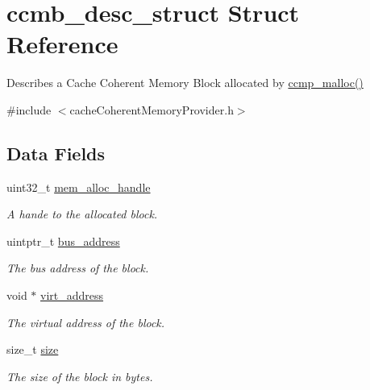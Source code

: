 \hypertarget{structccmb__desc__struct}{}\section{ccmb\+\_\+desc\+\_\+struct Struct Reference}
\label{structccmb__desc__struct}


Describes a Cache Coherent Memory Block allocated by \hyperlink{cacheCoherentMemoryProvider_8cpp_a72b3227fd1265a06a6b65e36b4c370ee}{ccmp\+\_\+malloc()}  




{\ttfamily \#include $<$cache\+Coherent\+Memory\+Provider.\+h$>$}

\subsection*{Data Fields}
\begin{DoxyCompactItemize}
\item 
uint32\+\_\+t \hyperlink{structccmb__desc__struct_a00cc7eaf94938d140481affeef8e0909}{mem\+\_\+alloc\+\_\+handle}\hypertarget{structccmb__desc__struct_a00cc7eaf94938d140481affeef8e0909}{}\label{structccmb__desc__struct_a00cc7eaf94938d140481affeef8e0909}

\begin{DoxyCompactList}\small\item\em A hande to the allocated block. \end{DoxyCompactList}\item 
uintptr\+\_\+t \hyperlink{structccmb__desc__struct_a30b6007ecbb4528361a724f8aed124df}{bus\+\_\+address}\hypertarget{structccmb__desc__struct_a30b6007ecbb4528361a724f8aed124df}{}\label{structccmb__desc__struct_a30b6007ecbb4528361a724f8aed124df}

\begin{DoxyCompactList}\small\item\em The bus address of the block. \end{DoxyCompactList}\item 
void $\ast$ \hyperlink{structccmb__desc__struct_a849fdbceb8080e18a11878131c25808f}{virt\+\_\+address}\hypertarget{structccmb__desc__struct_a849fdbceb8080e18a11878131c25808f}{}\label{structccmb__desc__struct_a849fdbceb8080e18a11878131c25808f}

\begin{DoxyCompactList}\small\item\em The virtual address of the block. \end{DoxyCompactList}\item 
size\+\_\+t \hyperlink{structccmb__desc__struct_a0bd1b903e5eb8f13d33c27fdf77bfbde}{size}\hypertarget{structccmb__desc__struct_a0bd1b903e5eb8f13d33c27fdf77bfbde}{}\label{structccmb__desc__struct_a0bd1b903e5eb8f13d33c27fdf77bfbde}

\begin{DoxyCompactList}\small\item\em The size of the block in bytes. \end{DoxyCompactList}\end{DoxyCompactItemize}


